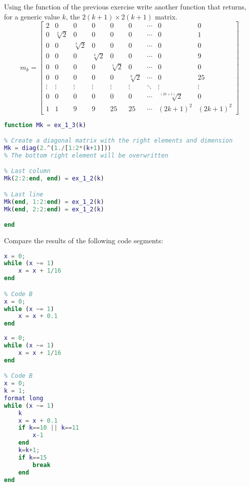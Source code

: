 \documentclass[12pt, a4paper]{report}
\newtheorem[style=M,bodystyle=\normalfont]{theorem}{Theorem}
\newtheorem[style=M,bodystyle=\normalfont]{corollary}{Corollary}
\newtheorem[style=M,bodystyle=\normalfont]{lemma}{Lemma}
\newtheorem[style=M,bodystyle=\normalfont]{definition}{Definition}
\begin{document}
    \begin{Exercise}[label=3]
        Using the function of the previous exercise write another function that returns, for a generic value $k$, the $2(k + 1) \times 2(k + 1)$ matrix.
        \[
            m_k=
            \begin{bmatrix}
                2 & 0 & 0 & 0 & 0 & 0 & \cdots & 0 & 0 \\
                0 & \sqrt[2]{2} & 0 & 0 & 0 & 0 & \cdots & 0 & 1 \\
                0 & 0 & \sqrt[3]{2} & 0 & 0 & 0 & \cdots & 0 & 0 \\
                0 & 0 & 0 & \sqrt[4]{2} & 0 & 0 & \cdots & 0 & 9 \\
                0 & 0 & 0 & 0 & \sqrt[5]{2} & 0 & \cdots & 0 & 0 \\
                0 & 0 & 0 & 0 & 0 & \sqrt[6]{2} & \cdots & 0 & 25 \\
                \vdots  & \vdots  & \vdots  & \vdots  & \vdots  & \vdots  & \ddots & \vdots  & \vdots  \\
                0 & 0 & 0 & 0 & 0 & 0 & \cdots & \sqrt[(2k+1)]{2} & 0 \\
                1 & 1 & 9 & 9 & 25 & 25 & \cdots & (2k+1)^2 & (2k+1)^2 
            \end{bmatrix} 
        \]
    \end{Exercise}
    \begin{Answer}[ref=3]
        \begin{lstlisting}[language=Matlab]
function Mk = ex_1_3(k)

% Create a diagonal matrix with the right elements and dimension
Mk = diag(2.^(1./[1:2*(k+1)]))
% The bottom right element will be overwritten

% Last column
Mk(2:2:end, end) = ex_1_2(k)

% Last line
Mk(end, 1:2:end) = ex_1_2(k)
Mk(end, 2:2:end) = ex_1_2(k)

end
        \end{lstlisting}
    \end{Answer}

    \newpage

    \begin{Exercise}[label=4]
        Compare the results of the following code segments:
        \begin{lstlisting}[language=Matlab]
% Code A
x = 0;
while (x ~= 1)
    x = x + 1/16
end

% Code B
x = 0;
while (x ~= 1)
    x = x + 0.1
end
        \end{lstlisting}
    \end{Exercise}
    \begin{Answer}[ref=4]
        \begin{lstlisting}[language=Matlab]
% Code A
x = 0;
while (x ~= 1)
    x = x + 1/16
end

% Code B
x = 0;
k = 1;
format long
while (x ~= 1)
    k
    x = x + 0.1
    if k==10 || k==11
        x-1
    end
    k=k+1;
    if k==15
        break
    end
end
        \end{lstlisting}   
    \end{Answer}
\end{document}
